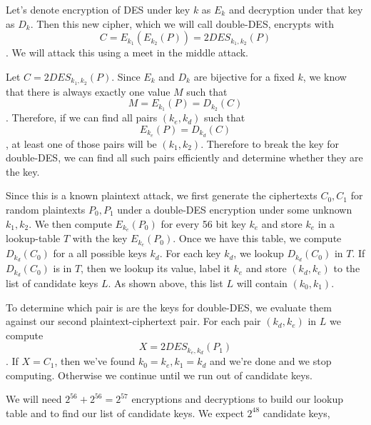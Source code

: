 Let's denote encryption of DES under key $k$ as $E_k$ and decryption under that key as
$D_k$. Then this new cipher, which we will call double-DES, encrypts with \[C =
E_{k_1}(E_{k_2}(P)) = 2DES_{k_1,k_2}(P)\]. We will attack this using a meet in the middle
attack. 

Let $C = 2DES_{k_1, k_2}(P)$. Since $E_k$ and $D_k$ are bijective for a fixed $k$, we know
that there is always exactly one value $M$ such that \[M = E_{k_1}(P) = D_{k_2}(C)\].
Therefore, if we can find all pairs $(k_e, k_d)$ such that \[E_{k_e}(P) = D_{k_d}(C)\], at
least one of those pairs will be $(k_1, k_2)$. Therefore to break the key for double-DES,
we can find all such pairs efficiently and determine whether they are the key. 

Since this is a known plaintext attack, we first generate the ciphertexts $C_0, C_1$ for
random plaintexts $P_0, P_1$ under a double-DES encryption under some unknown $k_1, k_2$.
We then compute $E_{k_e}(P_0)$ for every 56 bit key $k_e$ and store $k_e$ in a lookup-table
$T$ with the key $E_{k_e}(P_0)$. Once we have this table, we compute $D_{k_d}(C_0)$ for a
all possible keys $k_d$. For each key $k_d$, we lookup $D_{k_d}(C_0)$ in $T$. If
$D_{k_d}(C_0)$ is in $T$, then we lookup its value, label it $k_e$ and store $(k_d, k_e)$
to the list of candidate keys $L$. As shown above, this list $L$ will contain $(k_0,
k_1)$.

To determine which pair is are the keys for double-DES, we evaluate them against our
second plaintext-ciphertext pair. For each pair $(k_d, k_e)$ in $L$ we compute \[X =
2DES_{k_e, k_d}(P_1)\]. If $X = C_1$, then we've found $k_0 = k_e, k_1 = k_d$ and we're
done and we stop computing. Otherwise we continue until we run out of candidate keys. 

We will need $2^{56} + 2^{56} = 2^{57}$ encryptions and decryptions to build our lookup
table and to find our list of candidate keys. We expect $2^{48}$ candidate keys, 
